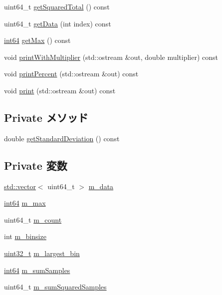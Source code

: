 \begin{DoxyCompactItemize}
\item 
uint64\_\-t \hyperlink{classHistogram_aeb3bc1d3b94443057568a6a04511cb4a}{getSquaredTotal} () const 
\item 
uint64\_\-t \hyperlink{classHistogram_abd462934da926cae3c5a17d71cd266d9}{getData} (int index) const 
\item 
\hyperlink{TypeDefines_8hh_aecfc3c54bd29ad5964e1c1c3ccbf89df}{int64} \hyperlink{classHistogram_a4704b6d6fba1fd2cca0790b79fa19279}{getMax} () const 
\item 
void \hyperlink{classHistogram_ae21abbf3b1ac14430fcb8e0cd64c9764}{printWithMultiplier} (std::ostream \&out, double multiplier) const 
\item 
void \hyperlink{classHistogram_a4f76274cefc18a95d39af1c3990880ef}{printPercent} (std::ostream \&out) const 
\item 
void \hyperlink{classHistogram_ac55fe386a101fbae38c716067c9966a0}{print} (std::ostream \&out) const 
\end{DoxyCompactItemize}
\subsection*{Private メソッド}
\begin{DoxyCompactItemize}
\item 
double \hyperlink{classHistogram_afe7c01ff325666636e278dc9a2a92ce1}{getStandardDeviation} () const 
\end{DoxyCompactItemize}
\subsection*{Private 変数}
\begin{DoxyCompactItemize}
\item 
\hyperlink{classstd_1_1vector}{std::vector}$<$ uint64\_\-t $>$ \hyperlink{classHistogram_a72cb4e620c90a68dcf5ff2e27232080d}{m\_\-data}
\item 
\hyperlink{TypeDefines_8hh_aecfc3c54bd29ad5964e1c1c3ccbf89df}{int64} \hyperlink{classHistogram_a9dbbdb7de023c9e3620bb2ce87952c35}{m\_\-max}
\item 
uint64\_\-t \hyperlink{classHistogram_a794f3b2a82f4b473977c033df87b3f49}{m\_\-count}
\item 
int \hyperlink{classHistogram_aaf8dca97f96bc3c08eeb39c6bfa922a1}{m\_\-binsize}
\item 
\hyperlink{Type_8hh_a435d1572bf3f880d55459d9805097f62}{uint32\_\-t} \hyperlink{classHistogram_a3ee3ad96f4970cc4f3b761c36f18d97b}{m\_\-largest\_\-bin}
\item 
\hyperlink{TypeDefines_8hh_aecfc3c54bd29ad5964e1c1c3ccbf89df}{int64} \hyperlink{classHistogram_a5afb7e042a0db65332d043743d6b5b75}{m\_\-sumSamples}
\item 
uint64\_\-t \hyperlink{classHistogram_a85d495b4b3972c42d6ababbb865c7260}{m\_\-sumSquaredSamples}
\end{DoxyCompactItemize}


